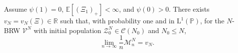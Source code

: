 \begin{corollary}
Assume $\psi(1)=0$, $\mathbb E[(\Xi_1)_+]<\infty$, and $\psi(0)>0$.
There exists $v_N=v_N(\Xi)\in\mathbb R$ such that, with probability one and in $\mathrm L^1(\mathbb P)$, for the $N$-BRW $\mathcal V^N$ with initial population $\mathcal Z^N_0\in\mathcal C(N_0)$ and $N_0\le N$,
\[
    \lim_{n\to\infty}\frac{1}{n}\mathcal M^N_n
    =
    v_N.
\]
\end{corollary}
